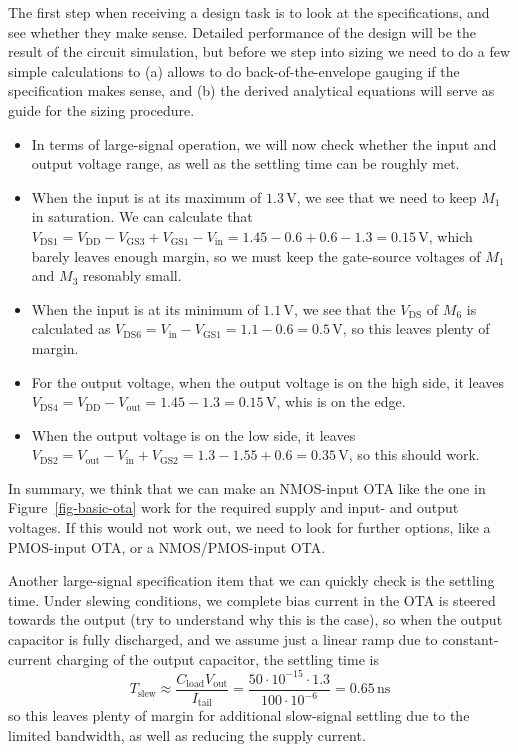 \documentclass[
  a4paper,
  DIV=11,
  numbers=noendperiod]{scrartcl}
\providecommand{\tightlist}{%
  \setlength{\itemsep}{0pt}\setlength{\parskip}{0pt}}\usepackage{longtable,booktabs,array}
\begin{document}
The first step when receiving a design task is to look at the
specifications, and see whether they make sense. Detailed performance of
the design will be the result of the circuit simulation, but before we
step into sizing we need to do a few simple calculations to (a) allows
to do back-of-the-envelope gauging if the specification makes sense, and
(b) the derived analytical equations will serve as guide for the sizing
procedure.

\begin{itemize}
\tightlist
\item
  In terms of large-signal operation, we will now check whether the
  input and output voltage range, as well as the settling time can be
  roughly met.
\item
  When the input is at its maximum of \(1.3\,\text{V}\), we see that we
  need to keep \(M_1\) in saturation. We can calculate that
  \(V_\mathrm{DS1} = V_\mathrm{DD}- V_\mathrm{GS3} + V_\mathrm{GS1} - V_\mathrm{in} = 1.45 - 0.6 + 0.6 - 1.3 = 0.15\,\text{V}\),
  which barely leaves enough margin, so we must keep the gate-source
  voltages of \(M_1\) and \(M_3\) resonably small.
\item
  When the input is at its minimum of \(1.1\,\text{V}\), we see that the
  \(V_\mathrm{DS}\) of \(M_6\) is calculated as
  \(V_\mathrm{DS6} = V_\mathrm{in} - V_\mathrm{GS1} = 1.1 - 0.6 = 0.5\,\text{V}\),
  so this leaves plenty of margin.
\item
  For the output voltage, when the output voltage is on the high side,
  it leaves
  \(V_\mathrm{DS4} = V_\mathrm{DD}- V_\mathrm{out} = 1.45 - 1.3 = 0.15\,\text{V}\),
  whis is on the edge.
\item
  When the output voltage is on the low side, it leaves
  \(V_\mathrm{DS2} = V_\mathrm{out} - V_\mathrm{in} + V_\mathrm{GS2} = 1.3 - 1.55 + 0.6 = 0.35\,\text{V}\),
  so this should work.
\end{itemize}

In summary, we think that we can make an NMOS-input OTA like the one in
Figure~\ref{fig-basic-ota} work for the required supply and input- and
output voltages. If this would not work out, we need to look for further
options, like a PMOS-input OTA, or a NMOS/PMOS-input OTA.

Another large-signal specification item that we can quickly check is the
settling time. Under slewing conditions, we complete bias current in the
OTA is steered towards the output (try to understand why this is the
case), so when the output capacitor is fully discharged, and we assume
just a linear ramp due to constant-current charging of the output
capacitor, the settling time is \[
T_\mathrm{slew} \approx \frac{C_\mathrm{load} V_\mathrm{out}}{I_\mathrm{tail}} = \frac{50 \cdot 10^{-15} \cdot 1.3}{100 \cdot 10^{-6}} = 0.65\,\text{ns}
\] so this leaves plenty of margin for additional slow-signal settling
due to the limited bandwidth, as well as reducing the supply current.
\end{document}
